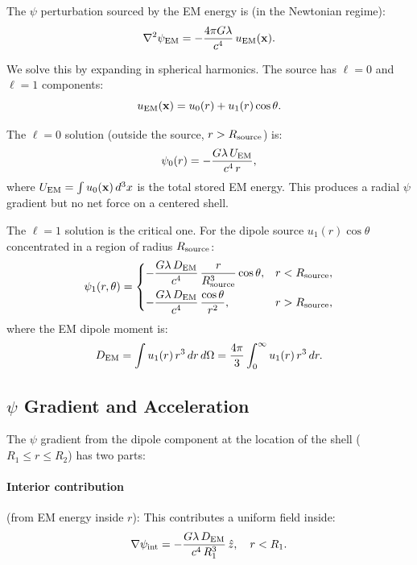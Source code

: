\documentclass[aps,prd,twocolumn,superscriptaddress,floatfix,nofootinbib]{revtex4-2}
\newcommand{\lam}{\lambda}
\begin{document}
The $\psi$ perturbation sourced by the EM energy is (in the Newtonian
regime):
\begin{equation}
\nabla^2\psi_{\rm EM} = -\frac{4\pi G\lam}{c^4}\,u_{\rm EM}(\mathbf{x}).
\end{equation}

We solve this by expanding in spherical harmonics. The source has
$\ell = 0$ and $\ell = 1$ components:
\begin{equation}
u_{\rm EM}(\mathbf{x}) = u_0(r) + u_1(r)\cos\theta.
\end{equation}

The $\ell = 0$ solution (outside the source, $r > R_{\rm source}$) is:
\begin{equation}
\psi_0(r) = -\frac{G\lam\,U_{\rm EM}}{c^4\,r},
\end{equation}
where $U_{\rm EM} = \int u_0(\mathbf{x})\,d^3x$ is the total stored
EM energy. This produces a radial $\psi$ gradient but no net force on
a centered shell.

The $\ell = 1$ solution is the critical one. For the dipole source
$u_1(r)\cos\theta$ concentrated in a region of radius $R_{\rm source}$:
\begin{equation}
\psi_1(r,\theta) = \begin{cases}
-\dfrac{G\lam\,D_{\rm EM}}{c^4}\,\dfrac{r}{R_{\rm source}^3}
\cos\theta, & r < R_{\rm source}, \\[8pt]
-\dfrac{G\lam\,D_{\rm EM}}{c^4}\,\dfrac{\cos\theta}{r^2},
& r > R_{\rm source},
\end{cases}
\label{eq:psi-dipole}
\end{equation}
where the EM dipole moment is:
\begin{equation}
D_{\rm EM} = \int u_1(r)\,r^3\,dr\,d\Omega
= \frac{4\pi}{3}\int_0^\infty u_1(r)\,r^3\,dr.
\end{equation}

\subsection{$\psi$ Gradient and Acceleration}
\label{sec:shell-gradient}

The $\psi$ gradient from the dipole component at the location of
the shell ($R_1 \leq r \leq R_2$) has two parts:

\paragraph{Interior contribution} (from EM energy inside $r$):
This contributes a uniform field inside:
\begin{equation}
\nabla\psi_{\rm int} = -\frac{G\lam\,D_{\rm EM}}{c^4\,R_1^3}\,\hat{z},
\quad r < R_1.
\end{equation}
\end{document}
